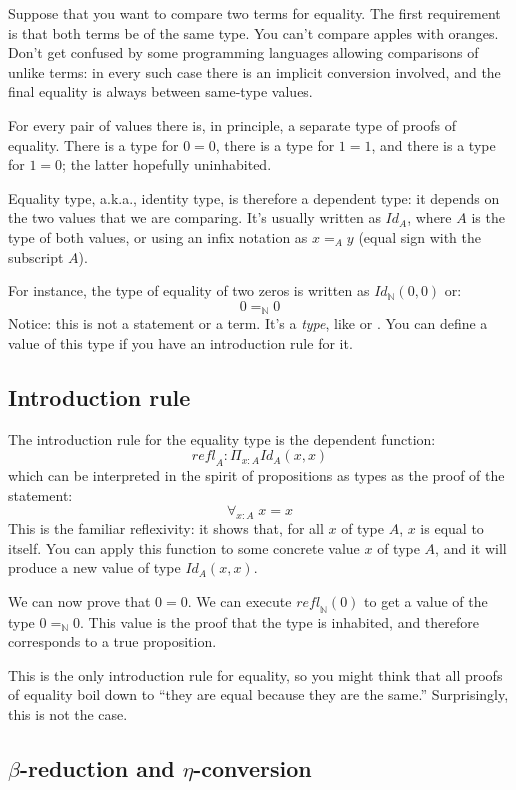 \documentclass[DaoFP]{subfiles}
\begin{document}
Suppose that you want to compare two terms for equality. The first requirement is that both terms be of the same type. You can't compare apples with oranges. Don't get confused by some programming languages allowing comparisons of unlike terms: in every such case there is an implicit conversion involved, and the final equality is always between same-type values. 

For every pair of values there is, in principle, a separate type of proofs of equality. There is a type for $0 = 0$, there is a type for $1=1$, and there is a type for $1 = 0$; the latter hopefully uninhabited. 

Equality type, a.k.a., identity type, is therefore a dependent type: it depends on the two values that we are comparing. It's usually written as $\mathit{Id}_A$, where $A$ is the type of both values, or using an infix notation as $x=_A y$ (equal sign with the subscript $A$). 

For instance, the type of equality of two zeros is written as $\mathit{Id}_{\mathbb{N}} (0, 0)$ or:
\[ 0 =_{\mathbb{N}} 0 \]
Notice: this is not a statement or a term. It's a \emph{type}, like  or . You can define a value of this type if you have an introduction rule for it.

\subsection{Introduction rule}

The introduction rule for the equality type is the dependent function: 
\[ \mathit{refl}_A \colon \Pi_{x : A}  \mathit{Id}_A  (x, x)\]
which can be interpreted in the spirit of propositions as types as the proof of the statement:
\[ \forall _{x:A} \;x = x \]
This is the familiar reflexivity: it shows that, for all $x$ of type $A$, $x$ is equal to itself. You can apply this function to some concrete value $x$ of type $A$, and it will produce a new value of type $\mathit{Id}_A  (x, x)$.

We can now prove that $0=0$. We can execute $\mathit{refl}_{\mathbb{N}} (0)$ to get a value of the type $0 =_{\mathbb{N}} 0$. This value is the proof that the type is inhabited, and therefore corresponds to a true proposition.

This is the only introduction rule for equality, so you might think that all proofs of equality boil down to ``they are equal because they are the same.'' Surprisingly, this is not the case. 

\subsection{$\beta$-reduction and $\eta$-conversion}
\end{document}
